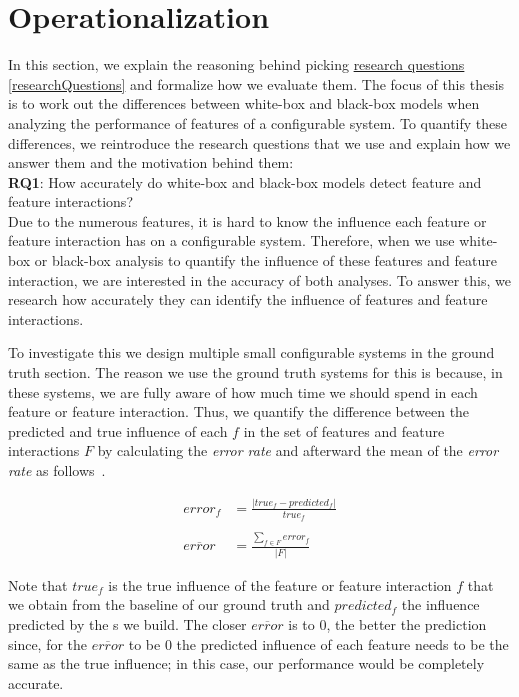 \section{Operationalization}\label{ch:operationalization}

In this section, we explain the reasoning behind picking \hyperref[researchQuestions]{research questions \ref*{researchQuestions}} 
and formalize how we evaluate them. 
The focus of this thesis is to work out the differences between white-box and black-box models when analyzing the performance of features of a configurable system. 
To quantify these differences, we reintroduce the research questions that we use and explain how we answer them and the motivation behind them:\\

\noindent \textbf{RQ1}: How accurately do white-box and black-box models detect feature and feature interactions? \\

Due to the numerous features, it is hard to know the influence each feature or feature interaction has on a configurable system. 
Therefore, when we use white-box or black-box analysis to quantify the influence of these features and feature interaction, 
we are interested in the accuracy of both analyses. 
To answer this, we research how accurately they can identify the influence of features and feature interactions.

To investigate this we design multiple small configurable systems in the ground truth section. 
The reason we use the ground truth systems for this is because, in these systems, 
we are fully aware of how much time we should spend in each feature or feature interaction. 
Thus, we quantify the difference between the predicted and true influence of each $f$ in the set of features and feature interactions $F$
by calculating the \emph{error rate} and afterward the mean of the \emph{error rate} as follows~\cite{mape}. %


\begin{align}
    error_f &= \frac{\lvert true_f - predicted_f \rvert}{true_f} \label{equ:APE_RQ1} \\ \nonumber \\
    \overline{error}  &= \frac{\sum_{f \in F} error_f}{\lvert F \rvert} \label{equ:MAPE_RQ1}
\end{align}

Note that $true_f$ is the true influence of the feature or feature interaction $f$ that we obtain from the baseline of our ground truth 
and $predicted_f$ the influence predicted by the {\perfInfluenceModel}s we build.
The closer $\overline{error}$ is to $0$, the better the prediction since, 
for the $\overline{error}$ to be $0$ the predicted influence of each feature needs to be the same as the true influence; 
in this case, our performance would be completely accurate. \\

